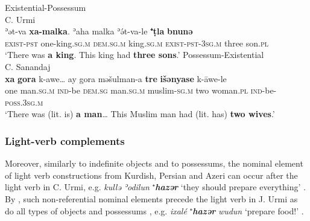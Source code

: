 \documentclass[output=paper,colorlinks,citecolor=brown,draftmode]{langscibook}
\begin{document}
\ea\label{NAINEI:ex:46}
Existential-Possessum\\
C. Urmi \citep[A39:\S 1]{Khan2016CUrmi} \\
\gll ʾət-va \textbf{xa-malka}. ʾaha malka ʾə́t-va-le \textbf{⁺\d{t}la} \textbf{bnunə} \\
     \textsc{exist-pst} one-king\textsc{.sg.m} \textsc{dem.sg.m} king\textsc{.sg.m} \textsc{exist-pst-3sg.m} three son\textsc{.pl} \\
\glt `There was \textbf{a king}. This king had \textbf{three sons}.'
\z
\ea\label{NAINEI:ex:47}
Possessum-Existential\\
C. Sanandaj \citep[3:\S 1--2]{Panoussi1990Senaya} \\
\gll \textbf{xa} \textbf{gora} k-awe… ay gora məšulman-a \textbf{tre} \textbf{išənyase} k-āwe-le \\
     one man\textsc{.sg.m} \textsc{ind-}be \textsc{dem.sg} man\textsc{.sg.m} muslim\textsc{-sg.m} two woman\textsc{.pl} \textsc{ind-}be\textsc{-poss.3sg.m} \\
\glt `There was (lit. is) \textbf{a man}… This Muslim man had (lit. has) \textbf{two wives}.'
\z

\subsubsection{Light-verb complements}\label{NAINEI:sec:3.2.2}
Moreover, similarly to indefinite objects and to possessums, the nominal element of light verb constructions from Kurdish, Persian and Azeri can occur after the light verb in C. Urmi, e.g. \textit{kullə} \textit{ʾodilun} ⁺\textit{\textbf{hazər}} `they should prepare everything' \parencite[A3:\S 70]{Khan2016CUrmi}. By , such non-referential nominal elements precede the light verb in J. Urmi as do all types of objects and possessums \parencite[173]{Garbell1965b}, e.g. \textit{ixalé} ⁺\textit{\textbf{hazər}} \textit{wudun} `prepare food!' \parencite[J. Urmi,][156]{Garbell1065a}. 
\end{document}
